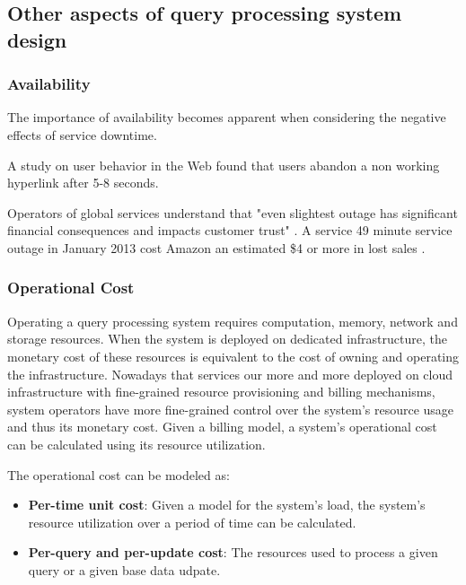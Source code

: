 \subsection{Other aspects of query processing system design}

\subsubsection{Availability}
The importance of availability becomes apparent when considering the negative effects of service downtime.

A study on user behavior in the Web \cite{nah:waitingtime} found that users abandon a non working hyperlink after
5-8 seconds.

Operators of global services understand that "even slightest outage has significant financial
consequences and impacts customer trust" \cite{deCandia:dynamo}.
A service 49 minute service outage in January 2013 cost Amazon an estimated \$4 or more in lost sales
\cite{infoworld:cloudoutages}.

\subsubsection{Operational Cost}
Operating a query processing system requires computation, memory, network and storage resources.
When the system is deployed on dedicated infrastructure, the monetary cost of these resources is equivalent to the cost
of owning and operating the infrastructure.
Nowadays that services our more and more deployed on cloud infrastructure with fine-grained resource provisioning and
billing mechanisms, system operators have more fine-grained control over the system's resource usage and thus its
monetary cost.
Given a billing model, a system's operational cost can be calculated using its resource utilization.

The operational cost can be modeled as:
\begin{itemize}
  \item \textbf{Per-time unit cost}: Given a model for the system's load, the system's resource utilization over a
  period of time can be calculated.
  \item \textbf{Per-query and per-update cost}: The resources used to process a given query or a given base data udpate.
\end{itemize}


